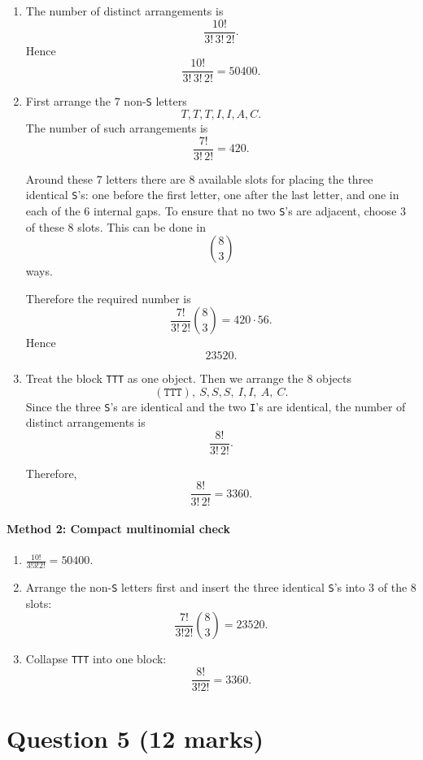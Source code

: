 \documentclass[12pt]{article}
\begin{document}
\begin{enumerate}[label=(\alph*)]
    \item The number of distinct arrangements is
    \[
    \frac{10!}{3!\,3!\,2!}.
    \]
    Hence
    \[
    \boxed{\frac{10!}{3!\,3!\,2!}=50400}.
    \]

    \item First arrange the $7$ non-\texttt{S} letters
    \[
    T,T,T,I,I,A,C.
    \]
    The number of such arrangements is
    \[
    \frac{7!}{3!\,2!}=420.
    \]

    Around these $7$ letters there are $8$ available slots for placing the three identical \texttt{S}'s: one before the first letter, one after the last letter, and one in each of the $6$ internal gaps.
    To ensure that no two \texttt{S}'s are adjacent, choose $3$ of these $8$ slots. This can be done in
    \[
    \binom{8}{3}
    \]
    ways.

    Therefore the required number is
    \[
    \frac{7!}{3!\,2!}\binom{8}{3}=420\cdot 56.
    \]
    Hence
    \[
    \boxed{23520}.
    \]

    \item Treat the block \texttt{TTT} as one object. Then we arrange the $8$ objects
    \[
    (\texttt{TTT}),\ S,S,S,\ I,I,\ A,\ C.
    \]
    Since the three \texttt{S}'s are identical and the two \texttt{I}'s are identical, the number of distinct arrangements is
    \[
    \frac{8!}{3!\,2!}.
    \]

    Therefore,
    \[
    \boxed{\frac{8!}{3!\,2!}=3360}.
    \]
\end{enumerate}

\paragraph{Method 2: Compact multinomial check}

\begin{enumerate}[label=(\alph*)]
    \item \(\displaystyle \frac{10!}{3!3!2!}=50400\).
    \item Arrange the non-\texttt{S} letters first and insert the three identical \texttt{S}'s into $3$ of the $8$ slots:
    \[
    \boxed{\frac{7!}{3!2!}\binom{8}{3}=23520}.
    \]
    \item Collapse \texttt{TTT} into one block:
    \[
    \boxed{\frac{8!}{3!2!}=3360}.
    \]
\end{enumerate}

\newpage
\section{Question 5 \hfill (12 marks)}
\end{document}
